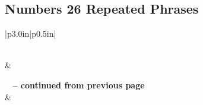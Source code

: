 \subsection{Numbers 26 Repeated Phrases}


\normalsize
 
\begin{center}
\begin{longtable}{|p{3.0in}|p{0.5in}|}
\caption[Numbers 26 Repeated Phrases]{Numbers 26 Repeated Phrases}\label{table:Repeated Phrases Numbers 26} \\
\hline {} &  \\ \hline 
\endfirsthead
 
{{\bfseries \tablename\ \thetable{} -- continued from previous page}} \\  
\hline {} &  \\ \hline 
\endhead
 

\end{longtable}
\end{center}
